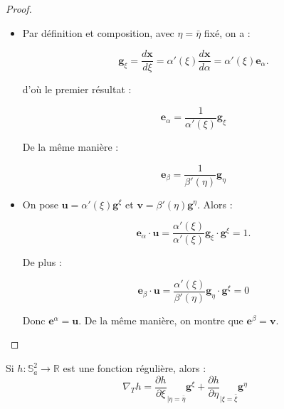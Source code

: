 \begin{proof}
\begin{itemize}
\item Par définition et composition, avec $\eta = \bar{\eta}$ fixé, on a :

\begin{equation}
\mathbf{g}_{\xi} = \dfrac{d \mathbf{x}}{d \xi} = \alpha'(\xi) \dfrac{d \mathbf{x}}{d \alpha} = \alpha'(\xi) \mathbf{e}_{\alpha}.
\end{equation}

d'où le premier résultat :

\begin{equation}
\mathbf{e}_{\alpha} = \dfrac{1}{\alpha'(\xi)} \mathbf{g}_{\xi}
\end{equation}

De la même manière :

\begin{equation}
\mathbf{e}_{\beta} = \dfrac{1}{\beta'(\eta)} \mathbf{g}_{\eta}
\end{equation}

\item On pose $\mathbf{u} = \alpha'(\xi) \mathbf{g}^{\xi}$ et $\mathbf{v} = \beta'(\eta) \mathbf{g}^{\eta}$. Alors :

\begin{equation}
\mathbf{e}_{\alpha} \cdot \mathbf{u} = \dfrac{\alpha'(\xi)}{\alpha'(\xi)} \mathbf{g}_{\xi} \cdot \mathbf{g}^{\xi} = 1.
\end{equation}

De plus :

\begin{equation}
\mathbf{e}_{\beta} \cdot \mathbf{u} = \dfrac{\alpha'(\xi)}{\beta'(\eta)} \mathbf{g}_{\eta} \cdot \mathbf{g}^{\xi} = 0
\end{equation}

Donc $\mathbf{e}^{\alpha} = \mathbf{u}$. De la même manière, on montre que $\mathbf{e}^{\beta} = \mathbf{v}$.
\end{itemize}
\end{proof}




\begin{theoreme}
Si $h : \mathbb{S}_a^2 \rightarrow \mathbb{R}$ est une fonction régulière, alors :
\begin{equation}
\nabla_T h = \dfrac{\partial h}{\partial \xi}_{|\eta = \bar{\eta}} \mathbf{g}^{\xi} + \dfrac{\partial h}{\partial \eta}_{|\xi = \bar{\xi}} \mathbf{g}^{\eta}
\end{equation}
\label{th:gradient_xieta}
\end{theoreme}



